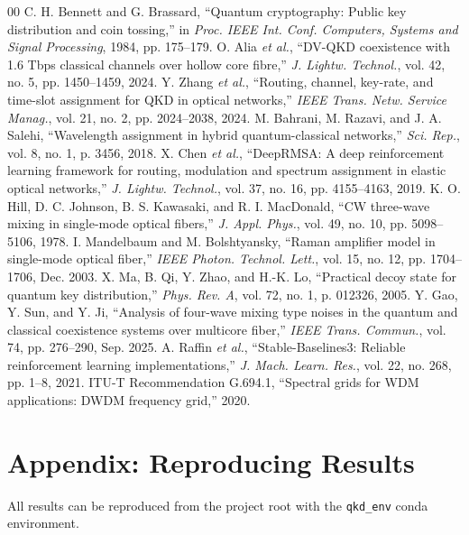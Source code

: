 \documentclass[conference]{IEEEtran}
\begin{document}
\begin{thebibliography}{00}
 C. H. Bennett and G. Brassard, ``Quantum cryptography: Public key distribution and coin tossing,'' in \textit{Proc. IEEE Int. Conf. Computers, Systems and Signal Processing}, 1984, pp. 175--179.
 O. Alia \textit{et al.}, ``DV-QKD coexistence with 1.6 Tbps classical channels over hollow core fibre,'' \textit{J. Lightw. Technol.}, vol. 42, no. 5, pp. 1450--1459, 2024.
 Y. Zhang \textit{et al.}, ``Routing, channel, key-rate, and time-slot assignment for QKD in optical networks,'' \textit{IEEE Trans. Netw. Service Manag.}, vol. 21, no. 2, pp. 2024--2038, 2024.
 M. Bahrani, M. Razavi, and J. A. Salehi, ``Wavelength assignment in hybrid quantum-classical networks,'' \textit{Sci. Rep.}, vol. 8, no. 1, p. 3456, 2018.
 X. Chen \textit{et al.}, ``DeepRMSA: A deep reinforcement learning framework for routing, modulation and spectrum assignment in elastic optical networks,'' \textit{J. Lightw. Technol.}, vol. 37, no. 16, pp. 4155--4163, 2019.
 K. O. Hill, D. C. Johnson, B. S. Kawasaki, and R. I. MacDonald, ``CW three-wave mixing in single-mode optical fibers,'' \textit{J. Appl. Phys.}, vol. 49, no. 10, pp. 5098--5106, 1978.
 I. Mandelbaum and M. Bolshtyansky, ``Raman amplifier model in single-mode optical fiber,'' \textit{IEEE Photon. Technol. Lett.}, vol. 15, no. 12, pp. 1704--1706, Dec. 2003.
 X. Ma, B. Qi, Y. Zhao, and H.-K. Lo, ``Practical decoy state for quantum key distribution,'' \textit{Phys. Rev. A}, vol. 72, no. 1, p. 012326, 2005.
 Y. Gao, Y. Sun, and Y. Ji, ``Analysis of four-wave mixing type noises in the quantum and classical coexistence systems over multicore fiber,'' \textit{IEEE Trans. Commun.}, vol. 74, pp. 276--290, Sep. 2025.
 A. Raffin \textit{et al.}, ``Stable-Baselines3: Reliable reinforcement learning implementations,'' \textit{J. Mach. Learn. Res.}, vol. 22, no. 268, pp. 1--8, 2021.
 ITU-T Recommendation G.694.1, ``Spectral grids for WDM applications: DWDM frequency grid,'' 2020.
\end{thebibliography}

\section*{Appendix: Reproducing Results}

All results can be reproduced from the project root with the \texttt{qkd\_env} conda environment.
\end{document}
